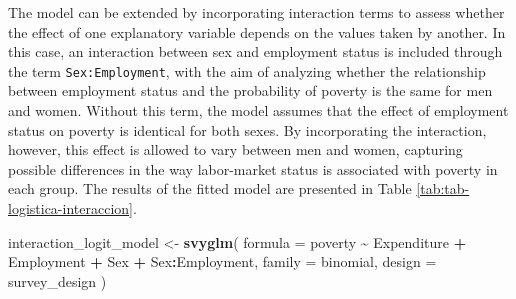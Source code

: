 \documentclass[
  english,
  12pt,
]{book}
\newenvironment{Shaded}{\begin{snugshade}}{\end{snugshade}}
\newcommand{\AttributeTok}[1]{\textcolor[rgb]{0.13,0.29,0.53}{#1}}
\newcommand{\FunctionTok}[1]{\textcolor[rgb]{0.13,0.29,0.53}{\textbf{#1}}}
\newcommand{\NormalTok}[1]{#1}
\newcommand{\OtherTok}[1]{\textcolor[rgb]{0.56,0.35,0.01}{#1}}
\newcommand{\SpecialCharTok}[1]{\textcolor[rgb]{0.81,0.36,0.00}{\textbf{#1}}}
\begin{document}
The model can be extended by incorporating interaction terms to assess whether the effect of one explanatory variable depends on the values taken by another. In this case, an interaction between sex and employment status is included through the term \texttt{Sex:Employment}, with the aim of analyzing whether the relationship between employment status and the probability of poverty is the same for men and women. Without this term, the model assumes that the effect of employment status on poverty is identical for both sexes. By incorporating the interaction, however, this effect is allowed to vary between men and women, capturing possible differences in the way labor-market status is associated with poverty in each group. The results of the fitted model are presented in Table \ref{tab:tab-logistica-interaccion}.

\begin{Shaded}
\begin{Highlighting}[]
\NormalTok{interaction\_logit\_model }\OtherTok{\textless{}{-}} \FunctionTok{svyglm}\NormalTok{(}
  \AttributeTok{formula =}\NormalTok{ poverty }\SpecialCharTok{\textasciitilde{}}\NormalTok{ Expenditure }\SpecialCharTok{+}\NormalTok{ Employment }\SpecialCharTok{+}\NormalTok{ Sex }\SpecialCharTok{+}\NormalTok{ Sex}\SpecialCharTok{:}\NormalTok{Employment,}
  \AttributeTok{family =}\NormalTok{ binomial,}
  \AttributeTok{design =}\NormalTok{ survey\_design}
\NormalTok{)}
\end{Highlighting}
\end{Shaded}
\end{document}
